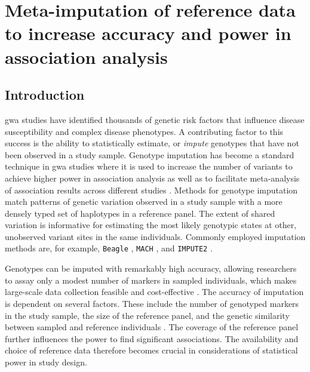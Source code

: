 
\glsresetall




{
\singlespacing
\chapter{Meta-imputation of reference data to increase accuracy and power in association analysis}
\label{ch:metaimpute}
\minitoc
}


%
\section{Introduction}
%


\Gls{gwa} studies have identified thousands of genetic risk factors that influence disease susceptibility and complex disease phenotypes.
A contributing factor to this success is the ability to statistically estimate, or \emph{impute} genotypes that have not been observed in a study sample.
Genotype imputation has become a standard technique in \gls{gwa} studies where it is used to increase the number of variants to achieve higher power in association analysis as well as to facilitate meta-analysis of association results across different studies \citep{Marchini:2007bg, Marchini:2010cga}.
Methods for genotype imputation match patterns of genetic variation observed in a study sample with a more densely typed set of haplotypes in a reference panel.
The extent of shared variation is informative for estimating the most likely genotypic states at other, unobserved variant sites in the same individuals.
Commonly employed imputation methods are, for example, \texttt{Beagle} \citep{Browning:2016iy}, \texttt{MACH} \citep{Li:2010kx}, and \texttt{IMPUTE2} \citep{Howie:2009hq,Howie:2011ia}.

Genotypes can be imputed with remarkably high accuracy, allowing researchers to assay only a modest number of markers in sampled individuals, which makes large-scale data collection feasible and cost-effective \citep{Li:2009kfa}.
The accuracy of imputation is dependent on several factors.
These include the number of genotyped markers in the study sample,  the size of the reference panel, and the genetic similarity between sampled and reference individuals \citep{Howie:2009hq, Roshyara:2015gi}.
The coverage of the reference panel further influences the power to find significant associations.
The availability and choice of reference data therefore becomes crucial in considerations of statistical power in study design.

